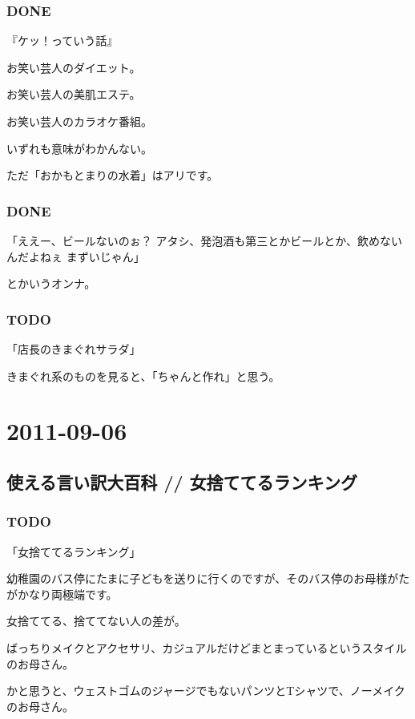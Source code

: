 \documentclass[11pt]{article}
\begin{document}
\subsubsection{\textbf{DONE}}
\label{sec-73_1_1}

『ケッ！っていう話』

お笑い芸人のダイエット。

お笑い芸人の美肌エステ。

お笑い芸人のカラオケ番組。

いずれも意味がわかんない。

ただ「おかもとまりの水着」はアリです。
\subsubsection{\textbf{DONE}}
\label{sec-73_1_2}

「ええー、ビールないのぉ？ 
  アタシ、発泡酒も第三とかビールとか、飲めないんだよねぇ
  まずいじゃん」

とかいうオンナ。
\subsubsection{\textbf{TODO}}
\label{sec-73_1_3}

「店長のきまぐれサラダ」

きまぐれ系のものを見ると、「ちゃんと作れ」と思う。
\section{2011-09-06}
\label{sec-74}
\subsection{使える言い訳大百科 // 女捨ててるランキング}
\label{sec-74_1}
\subsubsection{\textbf{TODO}}
\label{sec-74_1_1}

「女捨ててるランキング」

幼稚園のバス停にたまに子どもを送りに行くのですが、そのバス停のお母様がたがかなり両極端です。

女捨ててる、捨ててない人の差が。

ばっちりメイクとアクセサリ、カジュアルだけどまとまっているというスタイルのお母さん。

かと思うと、ウェストゴムのジャージでもないパンツとTシャツで、ノーメイクのお母さん。
\end{document}
